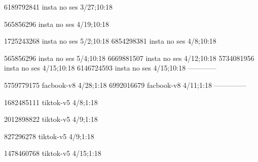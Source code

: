 
6189792841 insta no ses
3/27;10:18

565856296 insta no ses
4/19;10:18

1725243268 insta no ses
5/2;10:18
6854298381 insta no ses
4/8;10:18

565856296 insta no ses
5/4;10:18
6669881507 insta no ses
4/12;10:18
5734081956 insta no ses
4/15;10:18
6146724593 insta no ses
4/15;10:18
------------


5759779175 facbook-v8
4/28;1:18
6992016679 facbook-v8
4/11;1:18
--------------



1682485111 tiktok-v5
4/8;1:18

2012898822 tiktok-v5
4/9;1:18

827296278 tiktok-v5
4/9;1:18

1478460768 tiktok-v5
4/15;1:18
